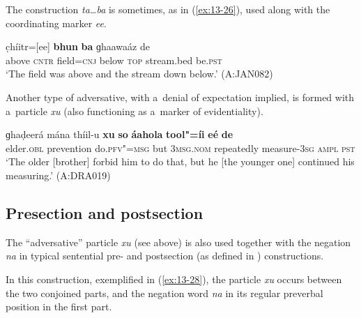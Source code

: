 The construction \textit{ta{\ldots}ba} is sometimes, as in (\ref{ex:13-26}), used along with the coordinating marker \textit{ee}.

\begin{exe}
\ex
\label{ex:13-26}
\gll [huṇḍ ta] c̣híitr=[ee] \textbf{bhun} \textbf{ba} ɡhaawaáz de \\
above \textsc{cntr} field=\textsc{cnj} below \textsc{top} stream.bed be.\textsc{pst} \\
\glt `The field was above and the stream down below.' (A:JAN082) 
\end{exe}


 Another type of adversative, with a~denial of expectation implied, is formed with a~particle \textit{xu} (also functioning as a~marker of evidentiality).

\begin{exe}
\ex
\label{ex:13-27}
\gll ɡhaḍeerá mána thíil-u \textbf{xu} \textbf{so} \textbf{áahola} \textbf{tool"=íi} \textbf{eé} \textbf{de} \\
elder.\textsc{obl} prevention do.\textsc{pfv"=msg} but \textsc{3msg.nom} repeatedly measure-\textsc{3sg} \textsc{ampl}{\protect\footnotemark} \textsc{pst} \\
\glt `The older [brother] forbid him to do that, but he [the younger one] continued his measuring.' (A:DRA019)
\end{exe}


\subsection{Presection and postsection}
\label{subsec:13-2-2}

The ``adversative'' particle \textit{xu} (see above) is also used together with the negation \textit{na} in typical sentential pre- and postsection (as defined in ) constructions.


 In this construction, exemplified in (\ref{ex:13-28}), the particle \textit{xu} occurs between the two conjoined parts, and the negation word \textit{na} in its regular preverbal position in the first part.

